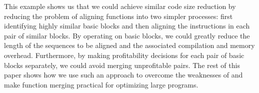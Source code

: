 
This example shows us that we could achieve similar code size reduction by reducing the problem of aligning functions into two simpler processes: first identifying highly similar basic blocks and then aligning the instructions in each pair of similar blocks. 
By operating on basic blocks, we could greatly reduce the length of the sequences to be aligned and the associated compilation and memory overhead. Furthermore, by making profitability decisions for each pair of basic blocks separately, we could avoid merging unprofitable pairs. The rest of this paper shows how we use such an approach to overcome the weaknesses of \SOAName and make function merging practical for optimizing large programs. 






